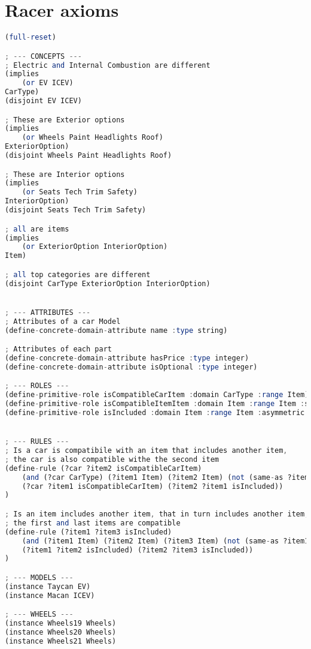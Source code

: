 \documentclass[a4paper,12pt]{report}
\begin{document}
\section{Racer axioms}
\lstset{style=mystyle}
\begin{lstlisting}[language=Octave]
(full-reset)

; --- CONCEPTS ---
; Electric and Internal Combustion are different
(implies
    (or EV ICEV)
CarType)
(disjoint EV ICEV)

; These are Exterior options
(implies 
    (or Wheels Paint Headlights Roof) 
ExteriorOption)
(disjoint Wheels Paint Headlights Roof)

; These are Interior options
(implies 
    (or Seats Tech Trim Safety)
InteriorOption)
(disjoint Seats Tech Trim Safety)

; all are items
(implies
    (or ExteriorOption InteriorOption)
Item)

; all top categories are different
(disjoint CarType ExteriorOption InteriorOption)


; --- ATTRIBUTES ---
; Attributes of a car Model
(define-concrete-domain-attribute name :type string)

; Attributes of each part
(define-concrete-domain-attribute hasPrice :type integer)
(define-concrete-domain-attribute isOptional :type integer)

; --- ROLES ---
(define-primitive-role isCompatibleCarItem :domain CarType :range Item)
(define-primitive-role isCompatibleItemItem :domain Item :range Item :symmetric t)
(define-primitive-role isIncluded :domain Item :range Item :asymmetric t)


; --- RULES ---
; Is a car is compatibile with an item that includes another item,
; the car is also compatible withe the second item
(define-rule (?car ?item2 isCompatibleCarItem)
    (and (?car CarType) (?item1 Item) (?item2 Item) (not (same-as ?item1 ?item2))
    (?car ?item1 isCompatibleCarItem) (?item2 ?item1 isIncluded)) 
)

; Is an item includes another item, that in turn includes another item,
; the first and last items are compatible
(define-rule (?item1 ?item3 isIncluded)
    (and (?item1 Item) (?item2 Item) (?item3 Item) (not (same-as ?item1 ?item2)) (not (same-as ?item2 ?item3)) (not (same-as ?item1 ?item3))
    (?item1 ?item2 isIncluded) (?item2 ?item3 isIncluded))
)

; --- MODELS ---
(instance Taycan EV)
(instance Macan ICEV)

; --- WHEELS ---
(instance Wheels19 Wheels)
(instance Wheels20 Wheels)
(instance Wheels21 Wheels)


\end{lstlisting}
\end{document}
